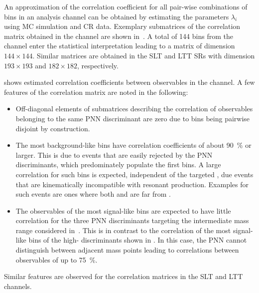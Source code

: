 An approximation of the correlation coefficient for all pair-wise combinations
of bins in an analysis channel can be obtained by estimating the parameters
$\lambda_i$ using MC simulation and CR data. Exemplary submatrices of the
correlation matrix obtained in the \hadhad channel are shown
in~. A total of 144 bins from the
\hadhad channel enter the statistical interpretation leading to a matrix of
dimension $144 \times 144$. Similar matrices are obtained in the \lephad SLT and
LTT SRs with dimension $193 \times 193$ and $182 \times 182$, respectively.

 shows estimated correlation
coefficients between observables in the \hadhad channel. A few features of the
correlation matrix are noted in the following:
\begin{itemize}

\item Off-diagonal elements of submatrices describing the correlation of
  observables belonging to the same PNN discriminant are zero due to bins being
  pairwise disjoint by construction.

\item The most background-like bins have correlation coefficients of about
  \SI{90}{\percent} or larger. This is due to events that are easily rejected by
  the PNN discriminants, which predominately populate the first bins. A large
  correlation for such bins is expected, independent of the targeted \mX, due
  events that are kinematically incompatible with resonant \HH
  production. Examples for such events are ones where both \mMMC and \mBB are
  far from \mH.

\item The observables of the most signal-like bins are expected to have little
  correlation for the three PNN discriminants targeting the intermediate mass
  range considered in~.  This is
  in contrast to the correlation of the most signal-like bins of the high-\mX
  discriminants shown in . In this
  case, the PNN cannot distinguish between adjacent mass points leading to
  correlations between observables of up to \SI{75}{\percent}.

\end{itemize}
Similar features are observed for the correlation matrices in the \lephad SLT
and LTT channels.

